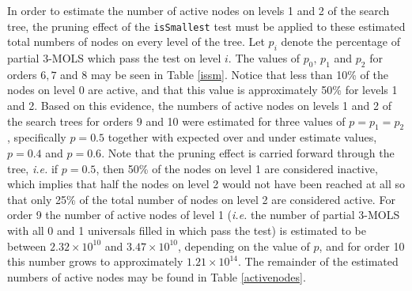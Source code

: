 In order to   estimate the number of active nodes on levels 1 and 2 of the search tree, the pruning effect of the \texttt{isSmallest} test must be applied to these estimated total numbers of nodes on every level of the tree. Let $p_i$ denote the percentage of partial $3$-MOLS which pass the \iis test on level $i$. The values of $p_0, \, p_1$ and $p_2$ for orders $6,7$ and 8 may be seen in Table \ref{issm}. Notice that less than 10\% of the  nodes on level 0 are active, and that this value is approximately 50\% for levels 1 and 2. Based on this evidence, the numbers of active nodes on levels 1 and 2 of the search trees for orders 9 and 10 were estimated for three values of $p=p_1=p_2$, specifically $p=0.5$ together with  expected over and under estimate values, $p=0.4$ and $p =0.6$. Note that the pruning effect is carried forward through the tree, \emph{i.e.} if $p=0.5$, then 50\% of  the nodes on level 1 are considered inactive, which implies that half the nodes on level 2 would not have been reached at all so that only 25\% of the total number of nodes on level 2 are considered active.   For order 9 the number of active nodes of level 1 (\emph{i.e.} the number of partial $3$-MOLS with all 0 and 1 universals filled in which pass  the \iis test) is estimated to be between $2.32\times 10^{10}$ and $3.47\times 10^{10}$, depending on the value of $p$, and for order 10 this number grows to approximately $1.21\times 10^{14}$.  The remainder of the estimated numbers of active nodes  may be found in Table \ref{activenodes}. 

